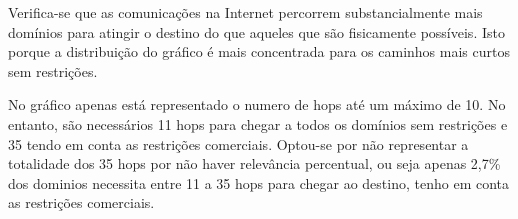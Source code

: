\documentclass{article}
\begin{document}
Verifica-se que as comunicações na Internet percorrem substancialmente mais domínios para atingir o destino do que aqueles que são fisicamente possíveis. Isto porque a distribuição do gráfico é mais concentrada para os caminhos mais curtos sem restrições.

No gráfico apenas está representado o numero de hops até um máximo de 10. No entanto, são necessários 11 hops para chegar a todos os domínios sem restrições e 35 tendo em conta as restrições comerciais. Optou-se por não representar a totalidade dos 35 hops por não haver relevância percentual, ou seja apenas 2,7\% dos dominios necessita entre 11 a 35 hops para chegar ao destino, tenho em conta as restrições comerciais.
\end{document}
